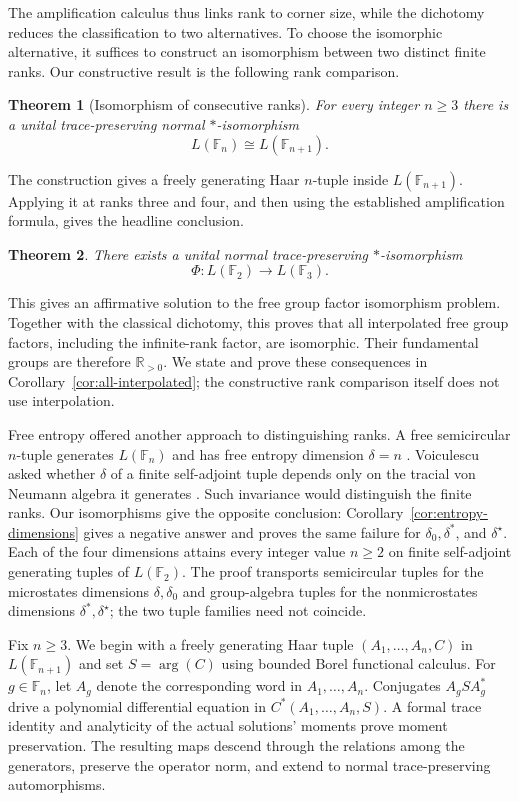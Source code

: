 \documentclass[11pt]{article}
\numberwithin{equation}{section}
\newtheorem{theorem}{Theorem}[section]
\theoremstyle{definition}
\theoremstyle{remark}
\newcommand{\F}{\mathbb F}
\newcommand{\R}{\mathbb R}
\begin{document}
The amplification calculus thus links rank to corner size, while the dichotomy reduces the classification to two alternatives. To choose the isomorphic alternative, it suffices to construct an isomorphism between two distinct finite ranks. Our constructive result is the following rank comparison.
\begin{theorem}[Isomorphism of consecutive ranks]
\label{thm:rank-step}
For every integer $n\geq3$ there is a unital trace-preserving normal
$*$-isomorphism
\[
 L(\F_n)\cong L(\F_{n+1}).
\]
\end{theorem}

The construction gives a freely generating Haar $n$-tuple inside $L(\F_{n+1})$. Applying it at ranks three and four, and then using the established amplification formula, gives the headline conclusion.
\begin{theorem}\label{thm:main}
There exists a unital normal trace-preserving $*$-isomorphism
\[
 \Phi:L(\F_2)\longrightarrow L(\F_3).
\]
\end{theorem}

This gives an affirmative solution to the free group factor isomorphism problem. Together with the classical dichotomy, this proves that all interpolated free group factors, including the infinite-rank factor, are isomorphic. Their fundamental groups are therefore $\R_{>0}$. We state and prove these consequences in Corollary~\ref{cor:all-interpolated}; the constructive rank comparison itself does not use interpolation.

Free entropy offered another approach to distinguishing ranks. A free semicircular $n$-tuple generates $L(\F_n)$ \cite[Remarks~1.10--1.11]{voiculescu1990} and has free entropy dimension $\delta=n$ \cite[Section~2.4(c),(d)]{voiculescu2002entropy}. Voiculescu asked whether $\delta$ of a finite self-adjoint tuple depends only on the tracial von Neumann algebra it generates \cite[Section~2.6]{voiculescu2002entropy}. Such invariance would distinguish the finite ranks. Our isomorphisms give the opposite conclusion: Corollary~\ref{cor:entropy-dimensions} gives a negative answer and proves the same failure for $\delta_0,\delta^*$, and $\delta^\star$. Each of the four dimensions attains every integer value $n\geq2$ on finite self-adjoint generating tuples of $L(\F_2)$. The proof transports semicircular tuples for the microstates dimensions $\delta,\delta_0$ and group-algebra tuples for the nonmicrostates dimensions $\delta^*,\delta^\star$; the two tuple families need not coincide.

Fix $n\geq3$. We begin with a freely generating Haar tuple $(A_1,\ldots,A_n,C)$ in $L(\F_{n+1})$ and set $S=\arg(C)$ using bounded Borel functional calculus. For $g\in\F_n$, let $A_g$ denote the corresponding word in $A_1,\ldots,A_n$. Conjugates $A_gSA_g^*$ drive a polynomial differential equation in $C^*(A_1,\ldots,A_n,S)$. A formal trace identity and analyticity of the actual solutions' moments prove moment preservation. The resulting maps descend through the relations among the generators, preserve the operator norm, and extend to normal trace-preserving automorphisms.
\end{document}
